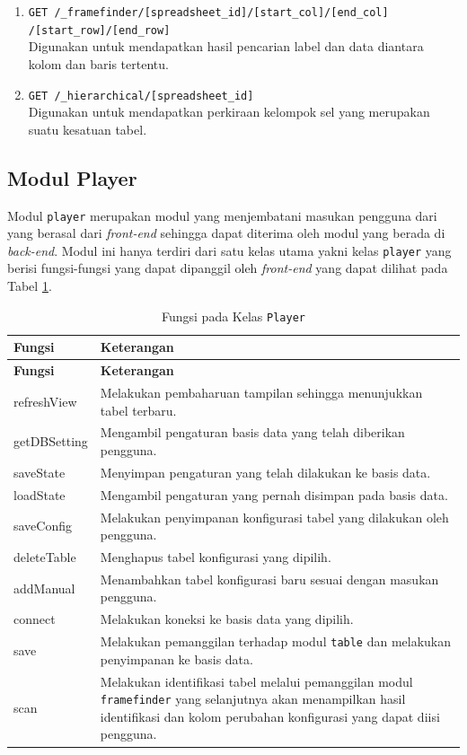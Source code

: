 \begin{enumerate}
		\item \texttt{GET /\_framefinder/[spreadsheet\_id]/[start\_col]/[end\_col]\\/[start\_row]/[end\_row]} \\
		Digunakan untuk mendapatkan hasil pencarian label dan data diantara kolom dan baris tertentu.

		\item \texttt{GET /\_hierarchical/[spreadsheet\_id]} \\
		Digunakan untuk mendapatkan perkiraan kelompok sel yang merupakan suatu kesatuan tabel.	
	\end{enumerate}

	\subsection{Modul Player}
	Modul \texttt{player} merupakan modul yang menjembatani masukan pengguna dari yang berasal dari \textit{front-end} sehingga dapat diterima oleh modul yang berada di \textit{back-end}. Modul ini hanya terdiri dari satu kelas utama yakni kelas \texttt{player} yang berisi fungsi-fungsi yang dapat dipanggil oleh \textit{front-end} yang dapat dilihat pada Tabel \ref{FungsiModulPlayer}.

	\begin{small}
	\begin{longtable}{ | p{2cm} | p{10cm} | }
	    \caption{Fungsi pada Kelas \texttt{Player}}
	    \label{FungsiModulPlayer}\\ \hline
	    \centering\bfseries{Fungsi} & \centering\bfseries{Keterangan} \tabularnewline \hline
	    \endfirsthead
	    \hline
	    \centering\bfseries{Fungsi} & \centering\bfseries{Keterangan} \tabularnewline \hline
	    \endhead
	    refreshView & Melakukan pembaharuan tampilan sehingga menunjukkan tabel terbaru.\\ \hline
	    getDBSetting & Mengambil pengaturan basis data yang telah diberikan pengguna.\\ \hline
	    saveState & Menyimpan pengaturan yang telah dilakukan ke basis data.\\ \hline
	    loadState & Mengambil pengaturan yang pernah disimpan pada basis data.\\ \hline
	    saveConfig & Melakukan penyimpanan konfigurasi tabel yang dilakukan oleh pengguna. \\ \hline
	    deleteTable & Menghapus tabel konfigurasi yang dipilih.\\ \hline
	    addManual & Menambahkan tabel konfigurasi baru sesuai dengan masukan pengguna.\\ \hline
	    connect & Melakukan koneksi ke basis data yang dipilih. \\ \hline
	    save & Melakukan pemanggilan terhadap modul \texttt{table} dan melakukan penyimpanan ke basis data. \\ \hline
	    scan & Melakukan identifikasi tabel melalui pemanggilan modul \texttt{framefinder} yang selanjutnya akan menampilkan hasil identifikasi dan kolom perubahan konfigurasi yang dapat diisi pengguna. \\ \hline
	\end{longtable}
	\end{small}
	
